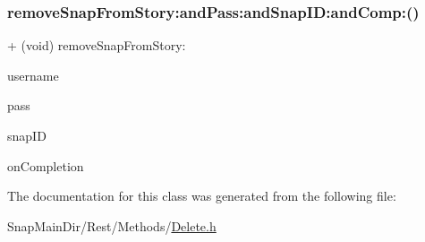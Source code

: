 \subsubsection{\texorpdfstring{remove\+Snap\+From\+Story\+:and\+Pass\+:and\+Snap\+I\+D\+:and\+Comp\+:()}{removeSnapFromStory:andPass:andSnapID:andComp:()}}
{\footnotesize\ttfamily + (void) remove\+Snap\+From\+Story\+: \begin{DoxyParamCaption}\item[{(N\+S\+String $\ast$)}]{username }\item[{andPass:(N\+S\+String $\ast$)}]{pass }\item[{andSnapID:(N\+S\+String $\ast$)}]{snap\+ID }\item[{andComp:(void($^\wedge$)(B\+O\+OL, id))}]{on\+Completion }\end{DoxyParamCaption}}



The documentation for this class was generated from the following file\+:\begin{DoxyCompactItemize}
\item 
Snap\+Main\+Dir/\+Rest/\+Methods/\hyperlink{_delete_8h}{Delete.\+h}\end{DoxyCompactItemize}
